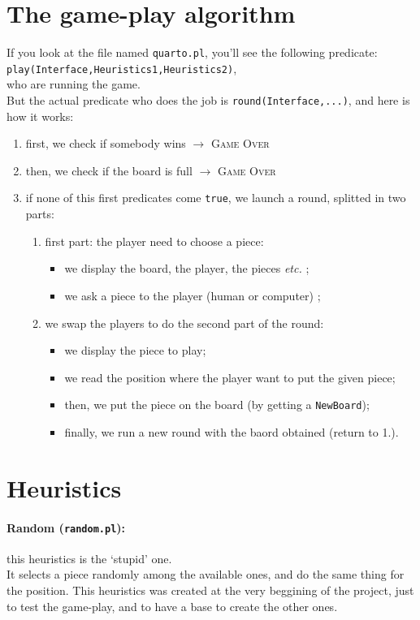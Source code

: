 \documentclass[a4paper,11pt]{article}
\newcommand{\tw}[1]{\texttt{#1}}
\begin{document}
	\section{The game-play algorithm}
		If you look at the file named \tw{quarto.pl}, you'll see the following predicate:\\
			\tw{play(Interface,Heuristics1,Heuristics2)},\\
		who are running the game. \\
		But the actual predicate who does the job is \tw{round(Interface,...)}, and here is how it works:
		\begin{enumerate}
			\item first, we check if somebody wins $\rightarrow$ \textsc{Game Over}
			\item then, we check if the board is full $\rightarrow$ \textsc{Game Over}
			\item if none of this first predicates come \tw{true}, we launch a round, splitted in two parts:
			\begin{enumerate}
				\item first part: the player need to choose a piece:
				\begin{itemize}
					\item we display the board, the player, the pieces \textit{etc.} ;
					\item we ask a piece to the player (human or computer) ;
				\end{itemize}
				\item we swap the players to do the second part of the round:
				\begin{itemize}
					\item we display the piece to play;
					\item we read the position where the player want to put the given piece;
					\item then, we put the piece on the board (by getting a \tw{NewBoard});
					\item finally, we run a new round with the baord obtained (return to 1.).
				\end{itemize}
			\end{enumerate}
		\end{enumerate}

	\section{Heuristics}
		\paragraph{Random (\tw{random.pl}):} this heuristics is the `stupid' one. \\
		It selects a piece randomly among the available ones, and do the same thing for the position. This heuristics was created at the very beggining of the project, just to test the game-play, and to have a base to create the other ones.
		
\end{document}
